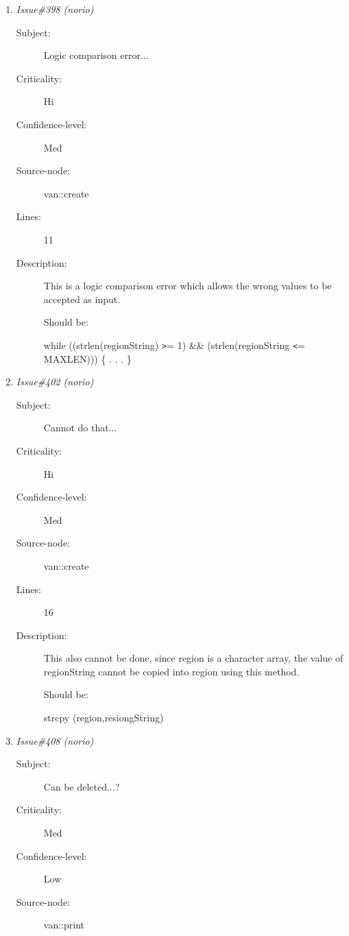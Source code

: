 \begin{enumerate}
\begin{description}
\item [Description:] Since the instance of van creates an character array, it
 has to get rid of it too.  Hence this will be a memory
 leak problem.....
 
 Should be:

 delete []region;
\end{description}
\item {\it Issue\#398 (norio)}
\begin{description}
\item [Subject:] Logic comparison error...
\item [Criticality:] Hi
\item [Confidence-level:] Med
\item [Source-node:] van::create

\item [Lines:] 11

\item [Description:] This is a logic comparison error which allows the wrong
 values to be accepted as input.

 Should be:

 while ((strlen(regionString) {\tt >}= 1) \&\& (strlen(regionString {\tt <}= MAXLEN)))
 \{
  .
  .
  .
 \}
\end{description}
\item {\it Issue\#402 (norio)}
\begin{description}
\item [Subject:] Cannot do that...
\item [Criticality:] Hi
\item [Confidence-level:] Med
\item [Source-node:] van::create

\item [Lines:] 16

\item [Description:] This also cannot be done, since region is a character array, the value of
regionString cannot be copied into region using this method.

 Should be:

 strcpy (region,resiongString)
\end{description}
\item {\it Issue\#408 (norio)}
\begin{description}
\item [Subject:] Can be deleted...?
\item [Criticality:] Med
\item [Confidence-level:] Low
\item [Source-node:] van::print


\end{description}
\end{enumerate}
